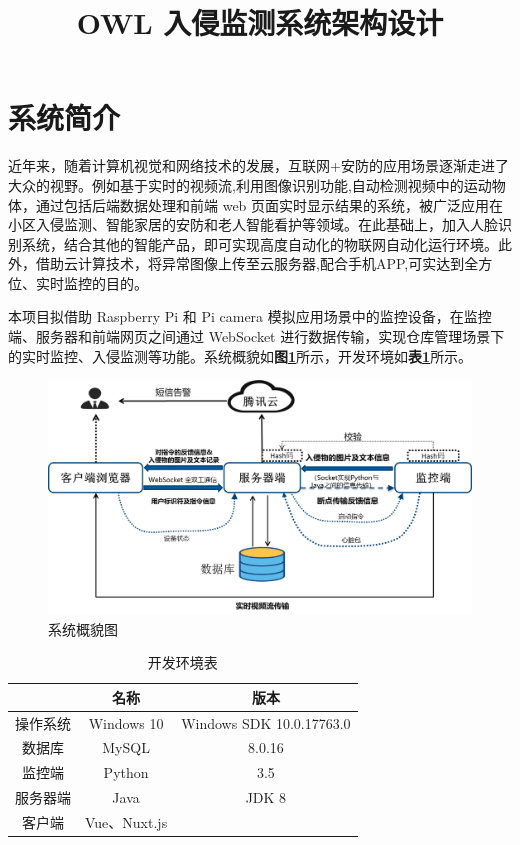 \documentclass[article]{BJTU-thesis}
\title{OWL 入侵监测系统架构设计}
\begin{document}
	\makecover
	
	\tableofcontents
	\newpage

	\newpage
	\setcounter{page}{1}
	\section{系统简介}
	近年来，随着计算机视觉和网络技术的发展，互联网+安防的应用场景逐渐走进了大众的视野。例如基于实时的视频流,利用图像识别功能,自动检测视频中的运动物体，通过包括后端数据处理和前端 web 页面实时显示结果的系统，被广泛应用在小区入侵监测、智能家居的安防和老人智能看护等领域。在此基础上，加入人脸识别系统，结合其他的智能产品，即可实现高度自动化的物联网自动化运行环境。此外，借助云计算技术，将异常图像上传至云服务器,配合手机APP,可实达到全方位、实时监控的目的。
	
	本项目拟借助 Raspberry Pi 和 Pi camera 模拟应用场景中的监控设备，在监控端、服务器和前端网页之间通过 WebSocket 进行数据传输，实现仓库管理场景下的实时监控、入侵监测等功能。系统概貌如\textbf{图\ref{fig:fig1}}所示，开发环境如\textbf{表\ref{tab:tab1}}所示。
	
	\begin{figure}[!htb]
		\centering
		\includegraphics[scale=0.6]{img/1.png}
		\caption{系统概貌图}\label{fig:fig1}
	\end{figure}

	\begin{table}[!htbp]
		\centering
		\caption{开发环境表}
		\label{tab:tab1}
		\begin{tabular}{|c|c|c|}
			\hline
			& 名称 & 版本 \\ \hline
			操作系统 & Windows 10 & Windows SDK 10.0.17763.0 \\ \hline
			数据库 & MySQL & 8.0.16 \\ \hline
			监控端 & Python & 3.5 \\ \hline
			服务器端 & Java & JDK 8 \\ \hline
			客户端 & Vue、Nuxt.js &  \\ \hline
		\end{tabular}
	\end{table}
	
\end{document}
